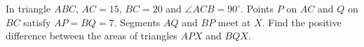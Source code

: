 In triangle $ABC$, $AC=15$, $BC=20$ and $\angle ACB=90^\circ$. Points $P$ on $AC$ and $Q$ on $BC$ satisfy $AP=BQ=7$. Segments $AQ$ and $BP$ meet at $X$. Find the positive difference between the areas of triangles $APX$ and $BQX$.

